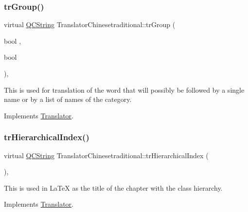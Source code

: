 \subsubsection{\texorpdfstring{trGroup()}{trGroup()}}
{\footnotesize\ttfamily virtual \mbox{\hyperlink{class_q_c_string}{Q\+C\+String}} Translator\+Chinesetraditional\+::tr\+Group (\begin{DoxyParamCaption}\item[{bool}]{,  }\item[{bool}]{ }\end{DoxyParamCaption})\hspace{0.3cm}{\ttfamily [inline]}, {\ttfamily [virtual]}}

This is used for translation of the word that will possibly be followed by a single name or by a list of names of the category. 

Implements \mbox{\hyperlink{class_translator}{Translator}}.

\mbox{\label{class_translator_chinesetraditional_a40a00739f96d6ca0c88bfa677c86e992}} 
\subsubsection{\texorpdfstring{trHierarchicalIndex()}{trHierarchicalIndex()}}
{\footnotesize\ttfamily virtual \mbox{\hyperlink{class_q_c_string}{Q\+C\+String}} Translator\+Chinesetraditional\+::tr\+Hierarchical\+Index (\begin{DoxyParamCaption}{ }\end{DoxyParamCaption})\hspace{0.3cm}{\ttfamily [inline]}, {\ttfamily [virtual]}}

This is used in La\+TeX as the title of the chapter with the class hierarchy. 

Implements \mbox{\hyperlink{class_translator}{Translator}}.

\mbox{\label{class_translator_chinesetraditional_a9b081ef4ec88e0e25d04824351a77089}} 

